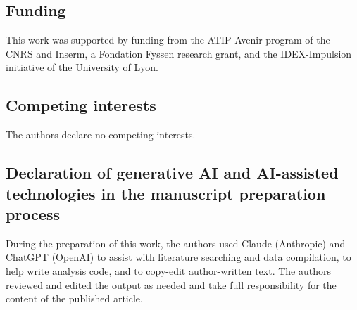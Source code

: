 \documentclass[9.5pt]{RandlettLab_elife}            %
\begin{document}
\subsection{Funding}
This work was supported by funding from the ATIP-Avenir program of the CNRS and Inserm, a Fondation Fyssen research grant, and the IDEX-Impulsion initiative of the University of Lyon.


\subsection{Competing interests}

The authors declare no competing interests.

\subsection{Declaration of generative AI and AI-assisted technologies in the manuscript preparation process}

During the preparation of this work, the authors used Claude (Anthropic) and ChatGPT (OpenAI) to assist with literature searching and data compilation, to help write analysis code, and to copy-edit author-written text. The authors reviewed and edited the output as needed and take full responsibility for the content of the published article.




\newpage
\end{document}
